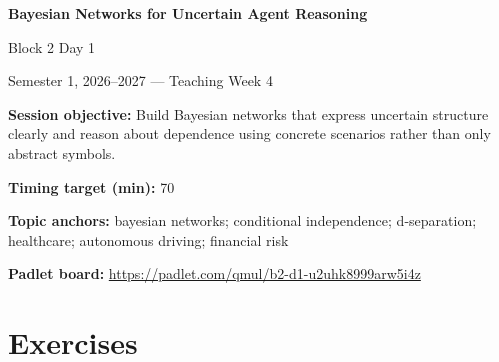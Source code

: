 \documentclass[11pt]{article}
\begin{document}
\begin{center}\LARGE\bfseries Bayesian Networks for Uncertain Agent Reasoning\end{center}

\begin{center}\large Block 2 Day 1\end{center}

\begin{center}Semester 1, 2026--2027 --- Teaching Week 4\end{center}

\begin{tcolorbox}[colback=MidnightBlue!4,colframe=MidnightBlue,title={Session Overview},fonttitle=\bfseries,breakable]
\textbf{Session objective:} Build Bayesian networks that express uncertain structure clearly and reason about dependence using concrete scenarios rather than only abstract symbols.

\textbf{Timing target (min):} 70

\textbf{Topic anchors:} bayesian networks; conditional independence; d-separation; healthcare; autonomous driving; financial risk

\textbf{Padlet board:} \url{https://padlet.com/qmul/b2-d1-u2uhk8999arw5i4z}
\end{tcolorbox}

\section*{Exercises}
\end{document}
